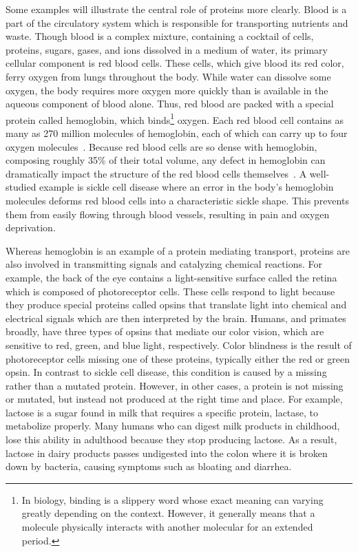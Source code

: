 Some examples will illustrate the central role of proteins more clearly. Blood is a part of the circulatory system which is responsible for transporting nutrients and waste. Though blood is a complex mixture, containing a cocktail of cells, proteins, sugars, gases, and ions dissolved in a medium of water, its primary cellular component is red blood cells. These cells, which give blood its red color, ferry oxygen from lungs throughout the body. While water can dissolve some oxygen, the body requires more oxygen more quickly than is available in the aqueous component of blood alone. Thus, red blood are packed with a special protein called hemoglobin, which binds\footnote{In biology, binding is a slippery word whose exact meaning can varying greatly depending on the context. However, it generally means that a molecule physically interacts with another molecular for an extended period.} oxygen. Each red blood cell contains as many as 270 million molecules of hemoglobin, each of which can carry up to four oxygen molecules~\cite{Pierig2008}. Because red blood cells are so dense with hemoglobin, composing roughly 35\% of their total volume, any defect in hemoglobin can dramatically impact the structure of the red blood cells themselves~\cite{Kanias2009}. A well-studied example is sickle cell disease where an error in the body's hemoglobin molecules deforms red blood cells into a characteristic sickle shape. This prevents them from easily flowing through blood vessels, resulting in pain and oxygen deprivation.

Whereas hemoglobin is an example of a protein mediating transport, proteins are also involved in transmitting signals and catalyzing chemical reactions. For example, the back of the eye contains a light-sensitive surface called the retina which is composed of photoreceptor cells. These cells respond to light because they produce special proteins called opsins that translate light into chemical and electrical signals which are then interpreted by the brain. Humans, and primates broadly, have three types of opsins that mediate our color vision, which are sensitive to red, green, and blue light, respectively. Color blindness is the result of photoreceptor cells missing one of these proteins, typically either the red or green opsin. In contrast to sickle cell disease, this condition is caused by a missing rather than a mutated protein. However, in other cases, a protein is not missing or mutated, but instead not produced at the right time and place. For example, lactose is a sugar found in milk that requires a specific protein, lactase, to metabolize properly. Many humans who can digest milk products in childhood, lose this ability in adulthood because they stop producing lactose. As a result, lactose in dairy products passes undigested into the colon where it is broken down by bacteria, causing symptoms such as bloating and diarrhea.

